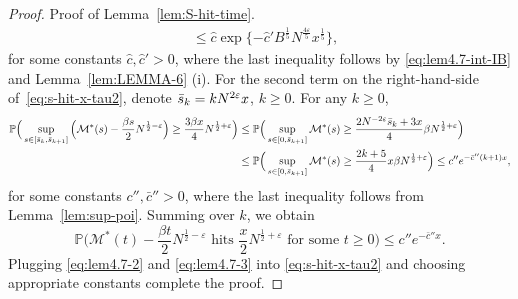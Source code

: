 \documentclass[11pt, reqno]{article}
\numberwithin{equation}{section}
\numberwithin{theorem}{section}
\begin{document}
\begin{proof}{Proof of Lemma~\ref{lem:S-hit-time}.}
\begin{equation}
\begin{split}
        & \leq  \hat{c}\exp \{-\hat{c}' B^{\frac{1}{5}}N^{\frac{4\varepsilon}{5}}x^{\frac{1}{5}}\}, 
        \end{split}
    \end{equation}
    for some constants $\hat{c},\hat{c}'>0$,
    where the last inequality follows by \eqref{eq:lem4.7-int-IB} and Lemma~\ref{lem:LEMMA-6} (i).
   For the second term on the right-hand-side of~\eqref{eq:s-hit-x-tau2}, denote $\Bar{s}_k=kN^{2\varepsilon}x$, $k\geq 0$.
    For any $k\geq 0$, 
    \begin{align*}
        \mathbb{P}\Big(\sup_{s\in[\Bar{s}_k,\Bar{s}_{k+1}]}\Big(\mathcal{M}^{*}(s)-\frac{\beta s}{2}N^{\frac{1}{2}-\varepsilon}\Big)\geq \frac{3\beta x}{4}N^{\frac{1}{2}+\varepsilon}\Big) 
        & \leq  \mathbb{P}\Big(\sup_{s\in[0,\Bar{s}_{k+1}]}\mathcal{M}^{*}(s)\geq \frac{2 N^{-2\varepsilon} \Bar{s}_{k}+3x}{4}\beta N^{\frac{1}{2}+\varepsilon}\Big)\\
        & \leq  \mathbb{P}\Big(\sup_{s\in[0,\Bar{s}_{k+1}]}\mathcal{M}^{*}(s)\geq \frac{2k+5}{4} x\beta N^{\frac{1}{2}+\varepsilon}\Big)
        \leq  c'' e^{-\bar{c}''(k+1)x},
    \end{align*}
    for some constants $c'',\bar{c}''>0$,
    where the last inequality follows from Lemma~\ref{lem:sup-poi}.
     Summing over $k$, we obtain \begin{equation}\label{eq:lem4.7-3}
         \mathbb{P}\Big(\mathcal{M}^{*}(t)-\frac{\beta t}{2}N^{\frac{1}{2}-\varepsilon}\text{ hits }\frac{x}{2}N^{\frac{1}{2}+\varepsilon}\text{ for some }t\geq 0\Big)\leq c''e^{-\bar{c}''x}.
     \end{equation}
Plugging \eqref{eq:lem4.7-2} and \eqref{eq:lem4.7-3} into \eqref{eq:s-hit-x-tau2}  and choosing appropriate constants complete the proof. 
\end{proof}
\bigskip
\end{document}
